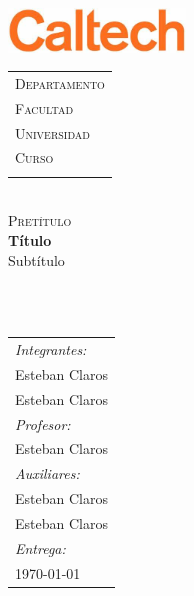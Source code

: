 \begin{titlepage}


\includegraphics[width=4.7cm]{images/logo.png} 
	\hspace{0cm}
\begin{tabular}{l}
\textsc{\color{red}Departamento}\\
\textsc{\color{gray51}Facultad}\\
\textsc{\color{gray51}Universidad}\\
\textsc{\color{gray51}Curso}\\
  \vspace*{1.1cm}\mbox{}
  \end{tabular}
\vspace*{2.5 cm}
  
\begin{center}
~\\[0.5cm]
{\color{gray71}\textsc{Pretítulo}}
\HRule~ \\[0.4cm]
{ \Huge \textup \bfseries  Título}\\[0.4cm]
{ \Large \textup{Subtítulo}}\\[0.2cm]
\HRule ~\\[1cm]
\end{center}
\begin{minipage}{.5\textwidth}
~
\end{minipage}
\begin{minipage}{.5\textwidth}
\begin{flushright}
\vspace{5cm} %
\begin{tabular}{l}

\emph{Integrantes:}\\
{\small Esteban Claros}\\
{\small Esteban Claros}\\[.2cm]


\emph{Profesor:} \\ 
{\small Esteban Claros}\\[0.2 cm]

\emph{Auxiliares:} \\
{\small	Esteban Claros}\\
{\small Esteban Claros}\\[.2cm]



\emph{Entrega:}\\
{\small \today}
\end{tabular}
\end{flushright}
\end{minipage}
\end{titlepage}



%